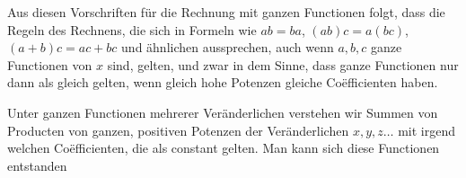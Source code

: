 Aus diesen Vorschriften für die Rechnung mit ganzen Functionen folgt,
dass die Regeln des Rechnens, die sich in Formeln wie $ab=ba$,
$(ab)c=a(bc)$, $(a+b)c=ac+bc$ und ähnlichen aussprechen, auch wenn
$a,b,c$ ganze Functionen von $x$ sind, gelten, und zwar in dem Sinne,
dass ganze Functionen nur dann als gleich gelten, wenn gleich hohe
Potenzen gleiche Coëfficienten haben.

Unter ganzen Functionen mehrerer Veränderlichen verstehen wir Summen
von Producten von ganzen, positiven Potenzen der Veränderlichen
$x,y,z\ldots$ mit irgend welchen Coëfficienten, die als constant
gelten. Man kann sich diese Functionen entstanden
\endgroup
